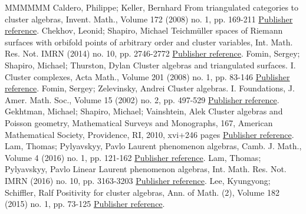 \documentclass[11pt]{article}
\theoremstyle{definition}
\numberwithin{equation}{section}
\begin{document}
\begin{thebibliography}{MMMMMM}
 Caldero, Philippe; Keller, Bernhard From triangulated categories to cluster algebras, Invent. Math., Volume 172 (2008) no. 1, pp. 169-211 \href{https://alco.centre-mersenne.org/articles/10.5802/alco.433/#basis}{Publisher reference}.
 Chekhov, Leonid; Shapiro, Michael Teichmüller spaces of Riemann surfaces with orbifold points of arbitrary order and cluster variables, Int. Math. Res. Not. IMRN (2014) no. 10, pp. 2746-2772 \href{https://alco.centre-mersenne.org/articles/10.5802/alco.433/#cluster-teich}{Publisher reference}.
 Fomin, Sergey; Shapiro, Michael; Thurston, Dylan Cluster algebras and triangulated surfaces. I. Cluster complexes, Acta Math., Volume 201 (2008) no. 1, pp. 83-146 \href{https://alco.centre-mersenne.org/articles/10.5802/alco.433/#cluster-triangulated-surface}{Publisher reference}.
 Fomin, Sergey; Zelevinsky, Andrei Cluster algebras. I. Foundations, J. Amer. Math. Soc., Volume 15 (2002) no. 2, pp. 497-529 \href{https://alco.centre-mersenne.org/articles/10.5802/alco.433/#clusteralgebrasi}{Publisher reference}.
 Gekhtman, Michael; Shapiro, Michael; Vainshtein, Alek Cluster algebras and Poisson geometry, Mathematical Surveys and Monographs, 167, American Mathematical Society, Providence, RI, 2010, xvi+246 pages \href{https://alco.centre-mersenne.org/articles/10.5802/alco.433/#cluster-poisson}{Publisher reference}.
 Lam, Thomas; Pylyavskyy, Pavlo Laurent phenomenon algebras, Camb. J. Math., Volume 4 (2016) no. 1, pp. 121-162 \href{https://alco.centre-mersenne.org/articles/10.5802/alco.433/#LP}{Publisher reference}.
 Lam, Thomas; Pylyavskyy, Pavlo Linear Laurent phenomenon algebras, Int. Math. Res. Not. IMRN (2016) no. 10, pp. 3163-3203 \href{https://alco.centre-mersenne.org/articles/10.5802/alco.433/#linearLP}{Publisher reference}.
 Lee, Kyungyong; Schiffler, Ralf Positivity for cluster algebras, Ann. of Math. (2), Volume 182 (2015) no. 1, pp. 73-125 \href{https://alco.centre-mersenne.org/articles/10.5802/alco.433/#cluster-positivity-LS}{Publisher reference}.
\end{thebibliography}
\end{document}
